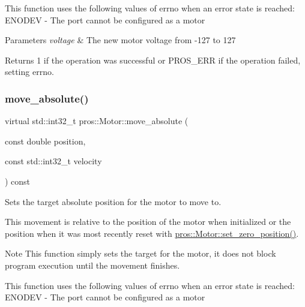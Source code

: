 This function uses the following values of errno when an error state is reached\+: E\+N\+O\+D\+EV -\/ The port cannot be configured as a motor


\begin{DoxyParams}{Parameters}
{\em voltage} & The new motor voltage from -\/127 to 127\\
\hline
\end{DoxyParams}
\begin{DoxyReturn}{Returns}
1 if the operation was successful or P\+R\+O\+S\+\_\+\+E\+RR if the operation failed, setting errno. 
\end{DoxyReturn}
\mbox{\label{classpros_1_1Motor_a7851ffa40c9803d75398a5be355de395}} 
\subsubsection{\texorpdfstring{move\+\_\+absolute()}{move\_absolute()}}
{\footnotesize\ttfamily virtual std\+::int32\+\_\+t pros\+::\+Motor\+::move\+\_\+absolute (\begin{DoxyParamCaption}\item[{const double}]{position,  }\item[{const std\+::int32\+\_\+t}]{velocity }\end{DoxyParamCaption}) const\hspace{0.3cm}{\ttfamily [virtual]}}



Sets the target absolute position for the motor to move to. 

This movement is relative to the position of the motor when initialized or the position when it was most recently reset with \hyperlink{classpros_1_1Motor_af20c036c1d5d68eb5e762c12f9a4b7fe}{pros\+::\+Motor\+::set\+\_\+zero\+\_\+position()}.

\begin{DoxyNote}{Note}
This function simply sets the target for the motor, it does not block program execution until the movement finishes.
\end{DoxyNote}
This function uses the following values of errno when an error state is reached\+: E\+N\+O\+D\+EV -\/ The port cannot be configured as a motor


